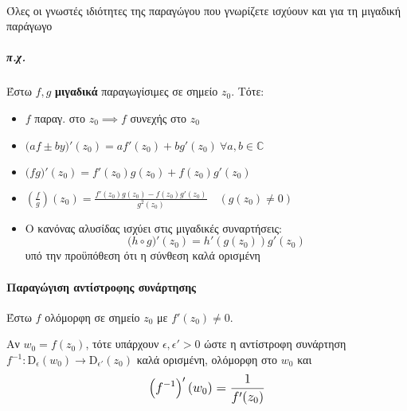 \documentclass[12pt,a4paper,titlepage,fleqn]{article}
\begin{document}
    \paragraph{}
    Όλες οι γνωστές ιδιότητες της παραγώγου που γνωρίζετε ισχύουν και για τη
    μιγαδική παράγωγο
    \subparagraph{π.χ.}
    Έστω \( f,g \) \textbf{μιγαδικά} παραγωγίσιμες σε σημείο \( z_0 \). Τότε:
    \begin{itemize}
       	\item \( f \) παραγ. στο \( z_0 \implies f \) συνεχής στο \( z_0 \)
       	\item \( \big(af\pm by\big)'(z_0)=
       	af'(z_0)+bg'(z_0)\ \forall a,b\in\mathbb C  \)
       	\item \( \big(fg\big)'(z_0) = f'(z_0)g(z_0)+f(z_0)g'(z_0) \)
       	\item \(  \left(
       	\frac{f}{g} \right)(z_0)= \frac{f'(z_0)g(z_0)-f(z_0)g'(z_0)}{g^2(z_0)}
       	\quad \left(g(z_0)\neq0\right)
       	\)
       	\item Ο κανόνας αλυσίδας ισχύει στις μιγαδικές συναρτήσεις:
       	\[
       	\big( h\circ g \big)'(z_0)=h'\left( g(z_0) \right)g'(z_0)
       	\]
       	υπό την προϋπόθεση ότι η σύνθεση καλά ορισμένη
    \end{itemize}
    
    \paragraph{Παραγώγιση αντίστροφης συνάρτησης} %
    Έστω \( f \) ολόμορφη σε σημείο \( z_0 \) με \( f'(z_0)\neq 0 \).
    
    Αν \( w_0=f(z_0) \), τότε υπάρχουν \( \epsilon,\epsilon' >0 \) ώστε η
    αντίστροφη συνάρτηση \( f^{-1}:\mathrm D_\epsilon(w_0)
    \to\mathrm D_{\epsilon'}(z_0)
    \) καλά ορισμένη, ολόμορφη στο \( w_0 \) και
    \[
    \mathlarger{
       	\left( f^{-1} \right)'(w_0) = \frac{1}{f'(z_0)}
    }
    \]
    
\end{document}
